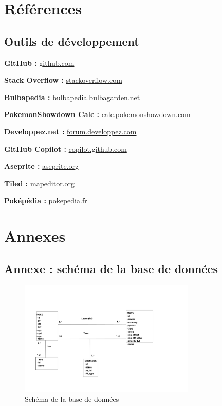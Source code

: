 \documentclass[12pt,a4paper, twoside]{article}
\begin{document}
\section{Références}
\subsection{Outils de développement}
\label{annexe:github}
\textbf{GitHub :} \href{https://github.com/Lounol72/ICPocket}{github.com}

\label{annexe:stackoverflow}
\textbf{Stack Overflow :} \href{https://stackoverflow.com/questions/tagged/sdl}{stackoverflow.com}

\label{annexe:bulbapedia}
\textbf{Bulbapedia :} \href{https://bulbapedia.bulbagarden.net/wiki}{bulbapedia.bulbagarden.net}

\label{annexe:showdown}
\textbf{PokemonShowdown Calc :} \href{https://calc.pokemonshowdown.com}{calc.pokemonshowdown.com}

\label{annexe:developpez}
\textbf{Developpez.net :} \href{https://forum.developpez.com}{forum.developpez.com}

\label{annexe:copilot}
\textbf{GitHub Copilot :} \href{https://copilot.github.com/}{copilot.github.com}

\label{annexe:aseprite}
\textbf{Aseprite :} \href{https://www.aseprite.org/}{aseprite.org}

\label{annexe:tiled}
\textbf{Tiled :} \href{https://www.mapeditor.org/}{mapeditor.org}

\label{annexe:pokepedia}
\textbf{Poképédia :} \href{https://www.pokepedia.fr/}{pokepedia.fr}

\section{Annexes}

\subsection{Annexe : schéma de la base de données}
\begin{figure}[h]
    \centering
    \includegraphics[width=0.75\textwidth]{schemaDB.png}
    \caption{Schéma de la base de données}
    \label{fig:dbschema}
\end{figure}
\end{document}
